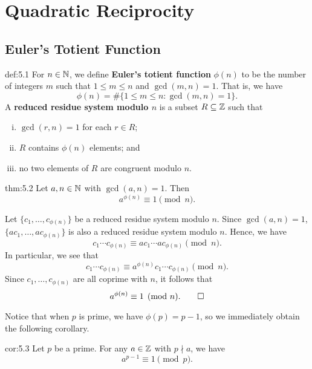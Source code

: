 \section{Quadratic Reciprocity}\label{sec:5}

\subsection{Euler's Totient Function}\label{subsec:5.1}

\vspace{2ex}
\begin{defn}{def:5.1}
    For $n \in \mathbb{N}$, we define {\bf Euler's totient function} $\phi(n)$ to be 
    the number of integers $m$ such that $1 \leq m \leq n$ and $\gcd(m, n) = 1$. 
    That is, we have 
    \[ \phi(n) = \#\{1 \leq m \leq n : \gcd(m, n) = 1\}. \] 
    A {\bf reduced residue system modulo $n$} is a subset $R \subseteq \mathbb{Z}$ such that 
    \begin{enumerate}[(i)]
        \item $\gcd(r, n) = 1$ for each $r \in R$; 
        \item $R$ contains $\phi(n)$ elements; and 
        \item no two elements of $R$ are congruent modulo $n$. 
    \end{enumerate}
\end{defn}

\begin{theo}[Euler]{thm:5.2}
    Let $a, n \in \mathbb{N}$ with $\gcd(a, n) = 1$. Then 
    \[ a^{\phi(n)} \equiv 1 \pmod n. \] 
\end{theo}
\begin{pf}
    Let $\{c_1, \dots, c_{\phi(n)}\}$ be a reduced residue system modulo $n$. 
    Since $\gcd(a, n) = 1$, $\{ac_1, \dots, ac_{\phi(n)}\}$ is also a 
    reduced residue system modulo $n$. Hence, we have 
    \[ c_1 \cdots c_{\phi(n)} \equiv ac_1 \cdots ac_{\phi(n)} \pmod n. \] 
    In particular, we see that 
    \[ c_1 \cdots c_{\phi(n)} \equiv a^{\phi(n)} c_1 \cdots c_{\phi(n)} \pmod n. \] 
    Since $c_1, \dots, c_{\phi(n)}$ are all coprime with $n$, it follows that 
    \[ a^{\phi(n)} \equiv 1 \pmod n. \qedhere \] 
\end{pf}

Notice that when $p$ is prime, we have $\phi(p) = p-1$, so we immediately 
obtain the following corollary. 

\begin{cor}{cor:5.3}
    Let $p$ be a prime. For any $a \in \mathbb{Z}$ with $p \nmid a$, we have 
    \[ a^{p-1} \equiv 1 \pmod p. \] 
\end{cor}

